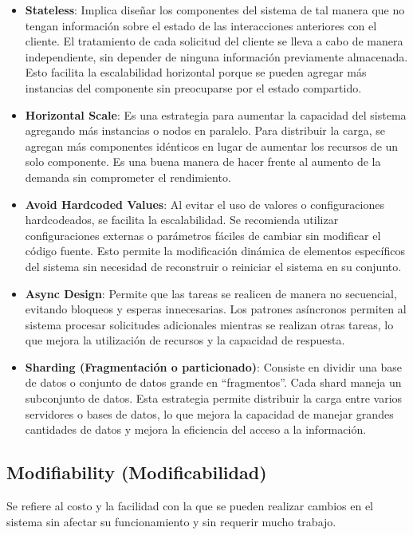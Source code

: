 \documentclass{article}
\begin{document}
		\begin{itemize}		
				\item \textbf{Stateless}\label{sec:escalabilidad_tacticas}: Implica diseñar los componentes del sistema de tal manera que no tengan información sobre el estado de las interacciones anteriores con el cliente. El tratamiento de cada solicitud del cliente se lleva a cabo de manera independiente, sin depender de ninguna información previamente almacenada. Esto facilita la escalabilidad horizontal porque se pueden agregar más instancias del componente sin preocuparse por el estado compartido.
				
				\item \textbf{Horizontal Scale}: Es una estrategia para aumentar la capacidad del sistema agregando más instancias o nodos en paralelo. Para distribuir la carga, se agregan más componentes idénticos en lugar de aumentar los recursos de un solo componente. Es una buena manera de hacer frente al aumento de la demanda sin comprometer el rendimiento.
				
				\item \textbf{Avoid Hardcoded Values}: Al evitar el uso de valores o configuraciones hardcodeados, se facilita la escalabilidad. Se recomienda utilizar configuraciones externas o parámetros fáciles de cambiar sin modificar el código fuente. Esto permite la modificación dinámica de elementos específicos del sistema sin necesidad de reconstruir o reiniciar el sistema en su conjunto.
				
				
				\item \textbf{Async Design}: Permite que las tareas se realicen de manera no secuencial, evitando bloqueos y esperas innecesarias. Los patrones asíncronos permiten al sistema procesar solicitudes adicionales mientras se realizan otras tareas, lo que mejora la utilización de recursos y la capacidad de respuesta.
				
				\item \textbf{Sharding (Fragmentación o particionado)}: Consiste en dividir una base de datos o conjunto de datos grande en ``fragmentos''. Cada shard maneja un subconjunto de datos. Esta estrategia permite distribuir la carga entre varios servidores o bases de datos, lo que mejora la capacidad de manejar grandes cantidades de datos y mejora la eficiencia del acceso a la información.
			
		\end{itemize}
			
		\subsection{Modifiability \small{(Modificabilidad)} }
		Se refiere al costo y la facilidad con la que se pueden realizar cambios en el sistema sin afectar su funcionamiento y sin requerir mucho trabajo.
		 
\end{document}
